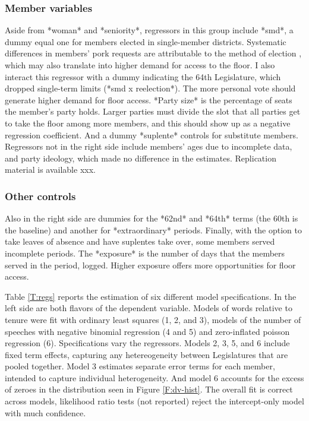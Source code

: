 \documentclass[letter,12pt]{article}
\begin{document}
    \subsubsection{Member variables}

Aside from *woman* and *seniority*, regressors in this group include *smd*, a dummy equal one for members elected in single-member districts. Systematic differences in members' pork requests are attributable to the method of election \citep{kerevelPork2015}, which may also translate into higher demand for access to the floor. I also interact this regressor with a dummy indicating the 64th Legislature, which dropped single-term limits (*smd x reelection*). The more personal vote should generate higher demand for floor access. *Party size* is the percentage of seats the member's party holds. Larger parties must divide the slot that all parties get to take the floor among more members, and this should show up as a negative regression coefficient. And a dummy *suplente* controls for substitute members. Regressors not in the right side include members' ages due to incomplete data, and party ideology, which made no difference in the estimates. Replication material is available xxx. 

    \subsubsection{Other controls}

Also in the right side are dummies for the *62nd* and *64th* terms (the 60th is the baseline) and another for *extraordinary* periods. Finally, with the option to take leaves of absence and have suplentes take over, some members served incomplete periods. The *exposure* is the number of days that the members served in the period, logged. Higher exposure offers more opportunities for floor access. 


Table \ref{T:regs} reports the estimation of six different model specifications. In the left side are both flavors of the dependent variable. Models of words relative to tenure were fit with ordinary least squares (1, 2, and 3), models of the number of speeches with negative binomial regression (4 and 5) and zero-inflated poisson regression (6). Specifications vary the regressors. Models 2, 3, 5, and 6 include fixed term effects, capturing any hetereogeneity between Legislatures that are pooled together. Model 3 estimates separate error terms for each member, intended to capture individual heterogeneity. And model 6 accounts for the excess of zeroes in the distribution seen in Figure \ref{F:dv-hist}. The overall fit is correct across models, likelihood ratio tests (not reported) reject the intercept-only model with much confidence. 
\end{document}
